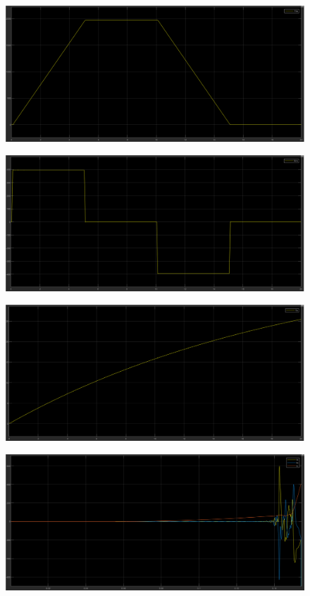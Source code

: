 \documentclass{article}
\begin{document}
\begin{figure}[H]
    \centering
    \includegraphics[width=1\textwidth]{5.2.5.d.5.png}
\end{figure}

\begin{figure}[H]
    \centering
    \includegraphics[width=1\textwidth]{5.2.5.d.6.png}
\end{figure}

\begin{figure}[H]
    \centering
    \includegraphics[width=1\textwidth]{5.2.5.d.7.png}
\end{figure}

\begin{figure}[H]
    \centering
    \includegraphics[width=1\textwidth]{5.2.5.d.8.png}
\end{figure}
\end{document}
